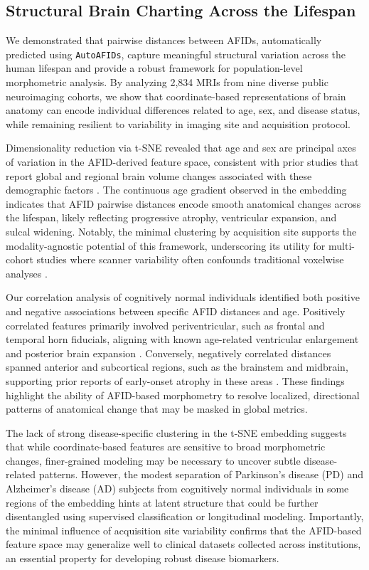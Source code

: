 \subsection{Structural Brain Charting Across the Lifespan}
We demonstrated that pairwise distances between AFIDs, automatically predicted using \texttt{AutoAFIDs}, capture meaningful structural variation across the human lifespan and provide a robust framework for population-level morphometric analysis. By analyzing 2,834 MRIs from nine diverse public neuroimaging cohorts, we show that coordinate-based representations of brain anatomy can encode individual differences related to age, sex, and disease status, while remaining resilient to variability in imaging site and acquisition protocol.

Dimensionality reduction via t-SNE revealed that age and sex are principal axes of variation in the AFID-derived feature space, consistent with prior studies that report global and regional brain volume changes associated with these demographic factors \cite{Fjell2010-aq, Ritchie2018-df}. The continuous age gradient observed in the embedding indicates that AFID pairwise distances encode smooth anatomical changes across the lifespan, likely reflecting progressive atrophy, ventricular expansion, and sulcal widening. Notably, the minimal clustering by acquisition site supports the modality-agnostic potential of this framework, underscoring its utility for multi-cohort studies where scanner variability often confounds traditional voxelwise analyses \cite{Fortin2018-ke}.

Our correlation analysis of cognitively normal individuals identified both positive and negative associations between specific AFID distances and age. Positively correlated features primarily involved periventricular, such as frontal and temporal horn fiducials, aligning with known age-related ventricular enlargement and posterior brain expansion \cite{Resnick2003-je}. Conversely, negatively correlated distances spanned anterior and subcortical regions, such as the brainstem and midbrain, supporting prior reports of early-onset atrophy in these areas \cite{Raz2005-jr}. These findings highlight the ability of AFID-based morphometry to resolve localized, directional patterns of anatomical change that may be masked in global metrics.

The lack of strong disease-specific clustering in the t-SNE embedding suggests that while coordinate-based features are sensitive to broad morphometric changes, finer-grained modeling may be necessary to uncover subtle disease-related patterns. However, the modest separation of Parkinson’s disease (PD) and Alzheimer’s disease (AD) subjects from cognitively normal individuals in some regions of the embedding hints at latent structure that could be further disentangled using supervised classification or longitudinal modeling. Importantly, the minimal influence of acquisition site variability confirms that the AFID-based feature space may generalize well to clinical datasets collected across institutions, an essential property for developing robust disease biomarkers.


